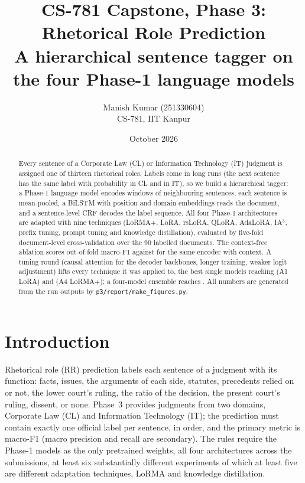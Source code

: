 \documentclass[11pt,a4paper]{article}
\title{\textbf{CS-781 Capstone, Phase 3: Rhetorical Role Prediction}\\[2pt]
\large A hierarchical sentence tagger on the four Phase-1 language models}
\author{Manish Kumar (251330604)\\ CS-781, IIT Kanpur}
\date{October 2026}
\newcommand{\code}[1]{\texttt{\small #1}}
\begin{document}
\maketitle

\begin{abstract}
\noindent Every sentence of a Corporate Law (CL) or Information Technology (IT) judgment is assigned one of
thirteen rhetorical roles.  Labels come in long runs (the next sentence has the same label with probability
\persistCL{} in CL and \persistIT{} in IT), so we build a hierarchical tagger: a Phase-1 language model
encodes windows of neighbouring sentences, each sentence is mean-pooled, a BiLSTM with position and domain
embeddings reads the document, and a sentence-level CRF decodes the label sequence.  All four Phase-1
architectures are adapted with nine techniques (LoRMA+, LoRA, rsLoRA, QLoRA, AdaLoRA, IA$^3$, prefix tuning,
prompt tuning and knowledge distillation), evaluated by five-fold document-level cross-validation over the 90
labelled documents.  The context-free ablation scores \oofEzero{} out-of-fold macro-F1 against \oofEone{} for
the same encoder with context.  A tuning round (causal attention for the decoder backbones, longer training,
weaker logit adjustment) lifts every technique it was applied to, the best single models reaching
\oofTonefour{} (A1 LoRA) and \oofTseven{} (A4 LoRMA+); a four-model ensemble reaches \ensCthree.  All numbers
are generated from the run outputs by \code{p3/report/make\_figures.py}.
\end{abstract}

\tableofcontents
\newpage

\section{Introduction}
Rhetorical role (RR) prediction labels each sentence of a judgment with its function: facts, issues, the
arguments of each side, statutes, precedents relied on or not, the lower court's ruling, the ratio of the
decision, the present court's ruling, dissent, or none.  Phase~3 provides judgments from two domains, Corporate
Law (CL) and Information Technology (IT); the prediction must contain exactly one official label per sentence,
in order, and the primary metric is macro-F1 (macro precision and recall are secondary).  The rules require
the Phase-1 models as the only pretrained weights, all four architectures across the submissions, at least six
substantially different experiments of which at least five are different adaptation techniques, LoRMA and
knowledge distillation.
\end{document}
